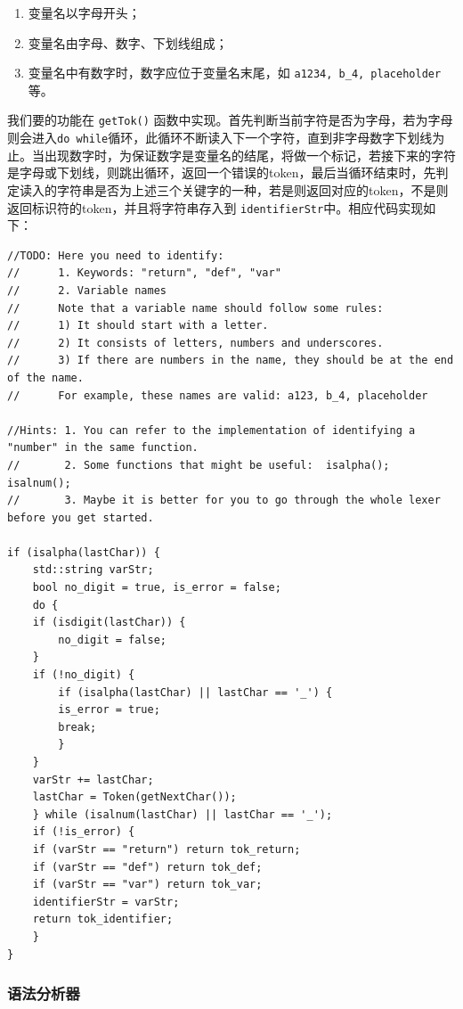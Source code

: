 \documentclass[lang=cn,11pt,a4paper]{elegantpaper}
\begin{document}
\begin{enumerate}
    \item 变量名以字母开头；
    \item 变量名由字母、数字、下划线组成；
    \item 变量名中有数字时，数字应位于变量名末尾，如 \texttt{a1234, b\_4, placeholder} 等。
\end{enumerate}

我们要的功能在 \texttt{getTok()} 函数中实现。首先判断当前字符是否为字母，若为字母则会进入\texttt{do while}循环，此循环不断读入下一个字符，直到非字母数字下划线为止。当出现数字时，为保证数字是变量名的结尾，将做一个标记，若接下来的字符是字母或下划线，则跳出循环，返回一个错误的token，最后当循环结束时，先判定读入的字符串是否为上述三个关键字的一种，若是则返回对应的token，不是则返回标识符的token，并且将字符串存入到 \texttt{identifierStr}中。相应代码实现如下：
\begin{lstlisting}
//TODO: Here you need to identify:
//      1. Keywords: "return", "def", "var"
//      2. Variable names
//      Note that a variable name should follow some rules:
//      1) It should start with a letter.
//      2) It consists of letters, numbers and underscores.
//      3) If there are numbers in the name, they should be at the end of the name.
//      For example, these names are valid: a123, b_4, placeholder

//Hints: 1. You can refer to the implementation of identifying a "number" in the same function.
//       2. Some functions that might be useful:  isalpha(); isalnum();
//       3. Maybe it is better for you to go through the whole lexer before you get started.

if (isalpha(lastChar)) {
    std::string varStr;
    bool no_digit = true, is_error = false;
    do {
    if (isdigit(lastChar)) {
        no_digit = false;
    }
    if (!no_digit) {
        if (isalpha(lastChar) || lastChar == '_') {
        is_error = true;
        break;
        }
    }
    varStr += lastChar;
    lastChar = Token(getNextChar());
    } while (isalnum(lastChar) || lastChar == '_');
    if (!is_error) {
    if (varStr == "return") return tok_return;
    if (varStr == "def") return tok_def;
    if (varStr == "var") return tok_var;
    identifierStr = varStr;
    return tok_identifier;
    }
}
\end{lstlisting}
\subsubsection{语法分析器}
\end{document}
